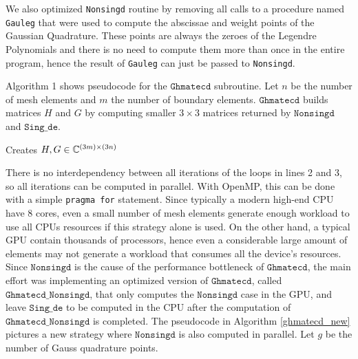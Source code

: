 We also optimized \texttt{Nonsingd} routine by removing all calls to a procedure named \texttt{Gauleg} that 
were used to compute the abscissae and weight points of the Gaussian Quadrature. These points are always the 
zeroes of the Legendre Polynomials and there is no need to compute them more than once in the entire program, 
hence the result of \texttt{Gauleg} can just be passed to \texttt{Nonsingd}.

Algorithm 1 shows pseudocode for the $\texttt{Ghmatecd}$ subroutine. Let $n$ be the number of mesh 
elements and $m$ the number of boundary elements. $\texttt{Ghmatecd}$ builds matrices $H$ and $G$ by computing 
smaller $3\times3$ matrices returned by $\texttt{Nonsingd}$ and $\texttt{Sing\_de}$.
%
\begin{algorithm}[H]
\label{ghmatecd_old}
\caption{Creates $H, G \in \mathbb{C}^{(3m)\times(3n)}$}
\begin{algorithmic}[1]
				\Else
				\EndIf
			\EndFor
	 \EndFor
	\EndProcedure
\end{algorithmic}
\end{algorithm}
%
There is no interdependency between all iterations of the loops in lines 2 and 3, so all iterations can be computed 
in parallel. With OpenMP, this can be done with a simple \texttt{pragma for} statement. Since typically a modern high-end 
CPU have 8 cores, even a small number of mesh elements generate enough 
workload to use all CPUs resources if this strategy alone is used. On the other hand, a typical GPU contain thousands 
of processors, hence even a considerable large amount of elements may not generate a workload that consumes all the device's 
resources. Since $\texttt{Nonsingd}$ is the cause of the performance bottleneck of $\texttt{Ghmatecd}$, 
the main effort was implementing
an optimized version of $\texttt{Ghmatecd}$, called $\texttt{Ghmatecd\_Nonsingd}$, that only computes the $\texttt{Nonsingd}$
case in the GPU, and leave $\texttt{Sing\_de}$ to be computed in the CPU after the computation of $\texttt{Ghmatecd\_Nonsingd}$ 
is completed. The pseudocode in Algorithm \ref{ghmatecd_new} pictures a new strategy where $\texttt{Nonsingd}$ is also computed in parallel.
Let $g$ be the number of Gauss quadrature points.

